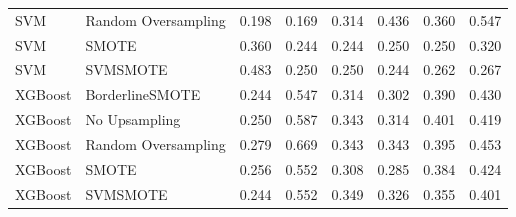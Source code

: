 \begin{tabular}{llllllll}
                         SVM & Random Oversampling & 0.198 &                     0.169 &                 0.314 &                  0.436 &                                   0.360 &    0.547 \\
                         SVM &               SMOTE & 0.360 &                     0.244 &                 0.244 &                  0.250 &                                   0.250 &    0.320 \\
                         SVM &            SVMSMOTE & 0.483 &                     0.250 &                 0.250 &                  0.244 &                                   0.262 &    0.267 \\
                     XGBoost &     BorderlineSMOTE & 0.244 &                     0.547 &                 0.314 &                  0.302 &                                   0.390 &    0.430 \\
                     XGBoost &       No Upsampling & 0.250 &                     0.587 &                 0.343 &                  0.314 &                                   0.401 &    0.419 \\
                     XGBoost & Random Oversampling & 0.279 &                     0.669 &                 0.343 &                  0.343 &                                   0.395 &    0.453 \\
                     XGBoost &               SMOTE & 0.256 &                     0.552 &                 0.308 &                  0.285 &                                   0.384 &    0.424 \\
                     XGBoost &            SVMSMOTE & 0.244 &                     0.552 &                 0.349 &                  0.326 &                                   0.355 &    0.401 \\
\bottomrule
\end{tabular}
